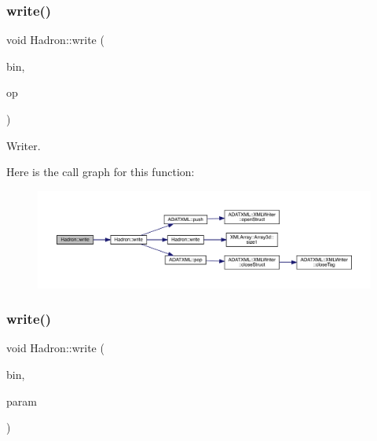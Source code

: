 \subsubsection{\texorpdfstring{write()}{write()}\hspace{0.1cm}{\footnotesize\ttfamily [90/95]}}
{\footnotesize\ttfamily void Hadron\+::write (\begin{DoxyParamCaption}\item[{\mbox{\hyperlink{classADATIO_1_1BinaryWriter}{Binary\+Writer}} \&}]{bin,  }\item[{const \mbox{\hyperlink{structHadron_1_1KeySingleHadronQuarkDeriv__t}{Key\+Single\+Hadron\+Quark\+Deriv\+\_\+t}} \&}]{op }\end{DoxyParamCaption})}



Writer. 

Here is the call graph for this function\+:
\nopagebreak
\begin{figure}[H]
\begin{center}
\leavevmode
\includegraphics[width=350pt]{d1/daf/namespaceHadron_a3d7c7b8fcc5310fee44294d5900816fb_cgraph}
\end{center}
\end{figure}
\mbox{\label{namespaceHadron_a9edaeb80eb507096c7529be211efa667}} 
\subsubsection{\texorpdfstring{write()}{write()}\hspace{0.1cm}{\footnotesize\ttfamily [91/95]}}
{\footnotesize\ttfamily void Hadron\+::write (\begin{DoxyParamCaption}\item[{\mbox{\hyperlink{classADATIO_1_1BinaryWriter}{Binary\+Writer}} \&}]{bin,  }\item[{const \mbox{\hyperlink{classHadron_1_1HadronDistOperatorRep__t}{Hadron\+Dist\+Operator\+Rep\+\_\+t}} \&}]{param }\end{DoxyParamCaption})}



